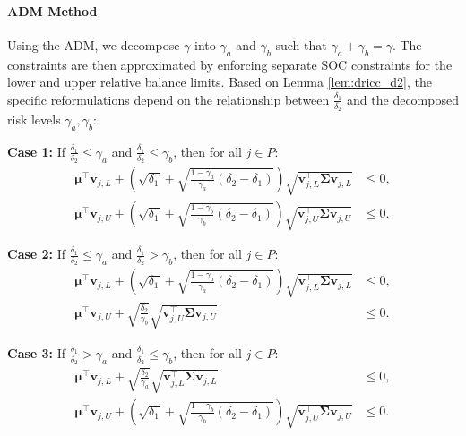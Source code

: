 \documentclass[preprint,12pt,authoryear]{elsarticle}
\begin{document}
\paragraph{ADM Method}
Using the ADM, we decompose $\gamma$ into $\gamma_a$ and $\gamma_b$ such that $\gamma_a + \gamma_b = \gamma$. The constraints are then approximated by enforcing separate SOC constraints for the lower and upper relative balance limits. Based on Lemma \ref{lem:dricc_d2}, the specific reformulations depend on the relationship between $\frac{\delta_1}{\delta_2}$ and the decomposed risk levels $\gamma_a, \gamma_b$:

\textbf{Case 1:} If $\frac{\delta_1}{\delta_2} \leqslant \gamma_a$ and $\frac{\delta_1}{\delta_2} \leqslant \gamma_b$, then for all $j \in P$:
\begin{align}
\boldsymbol{\mu}^\top \mathbf{v}_{j,L} + \left(\sqrt{\delta_1} + \sqrt{\frac{1 - \gamma_a}{\gamma_a} (\delta_2 - \delta_1)}\right) \sqrt{\mathbf{v}_{j,L}^\top \boldsymbol{\Sigma} \mathbf{v}_{j,L}} &\leqslant 0, \label{eq:rel_balance_d2_adm_case1_lower} \\
\boldsymbol{\mu}^\top \mathbf{v}_{j,U} + \left(\sqrt{\delta_1} + \sqrt{\frac{1 - \gamma_b}{\gamma_b} (\delta_2 - \delta_1)}\right) \sqrt{\mathbf{v}_{j,U}^\top \boldsymbol{\Sigma} \mathbf{v}_{j,U}} &\leqslant 0. \label{eq:rel_balance_d2_adm_case1_upper}
\end{align}

\textbf{Case 2:} If $\frac{\delta_1}{\delta_2} \leqslant \gamma_a$ and $\frac{\delta_1}{\delta_2} > \gamma_b$, then for all $j \in P$:
\begin{align}
\boldsymbol{\mu}^\top \mathbf{v}_{j,L} + \left(\sqrt{\delta_1} + \sqrt{\frac{1 - \gamma_a}{\gamma_a} (\delta_2 - \delta_1)}\right) \sqrt{\mathbf{v}_{j,L}^\top \boldsymbol{\Sigma} \mathbf{v}_{j,L}} &\leqslant 0, \label{eq:rel_balance_d2_adm_case2_lower} \\
\boldsymbol{\mu}^\top \mathbf{v}_{j,U} + \sqrt{\frac{\delta_2}{\gamma_b}} \sqrt{\mathbf{v}_{j,U}^\top \boldsymbol{\Sigma} \mathbf{v}_{j,U}} &\leqslant 0. \label{eq:rel_balance_d2_adm_case2_upper}
\end{align}

\textbf{Case 3:} If $\frac{\delta_1}{\delta_2} > \gamma_a$ and $\frac{\delta_1}{\delta_2} \leqslant \gamma_b$, then for all $j \in P$:
\begin{align}
\boldsymbol{\mu}^\top \mathbf{v}_{j,L} + \sqrt{\frac{\delta_2}{\gamma_a}} \sqrt{\mathbf{v}_{j,L}^\top \boldsymbol{\Sigma} \mathbf{v}_{j,L}} &\leqslant 0, \label{eq:rel_balance_d2_adm_case3_lower} \\
\boldsymbol{\mu}^\top \mathbf{v}_{j,U} + \left(\sqrt{\delta_1} + \sqrt{\frac{1 - \gamma_b}{\gamma_b} (\delta_2 - \delta_1)}\right) \sqrt{\mathbf{v}_{j,U}^\top \boldsymbol{\Sigma} \mathbf{v}_{j,U}} &\leqslant 0. \label{eq:rel_balance_d2_adm_case3_upper}
\end{align}
\end{document}
